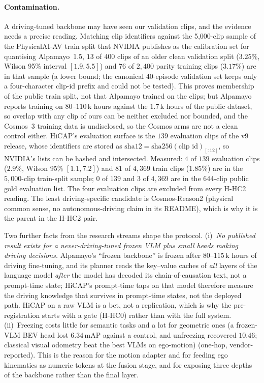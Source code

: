\paragraph{Contamination.}
A driving-tuned backbone may have seen our validation clips, and the evidence needs a precise reading. Matching clip identifiers against the 5,000-clip sample of the PhysicalAI-AV train split that NVIDIA publishes as the calibration set for quantising Alpamayo~1.5, $13$ of $400$ clips of an older clean validation split ($3.25\%$, Wilson 95\% interval $[1.9,5.5]$) and $76$ of $2{,}400$ parity training clips ($3.17\%$) are in that sample\evM{} (a lower bound; the canonical 40-episode validation set keeps only a four-character clip-id prefix and could not be tested). This proves membership of the public train split, not that Alpamayo trained on the clips; but Alpamayo reports training on $80$--$110$\,k hours against the $1.7$\,k hours of the public dataset\evP, so overlap with any clip of ours can be neither excluded nor bounded, and the Cosmos~3 training data is undisclosed, so the Cosmos arms are not a clean control either. HiCAP's evaluation surface is the $139$ evaluation clips of the v9 release, whose identifiers are stored as $\text{sha12}=\text{sha256}(\text{clip id})_{[:12]}$, so NVIDIA's lists can be hashed and intersected. Measured\evM: $4$ of $139$ evaluation clips ($2.9\%$, Wilson 95\% $[1.1,7.2]$) and $81$ of $4{,}369$ train clips ($1.85\%$) are in the $5{,}000$-clip train-split sample; $0$ of $139$ and $3$ of $4{,}369$ are in the 644-clip public gold evaluation list. The four evaluation clips are excluded from every H-HC2 reading. The least driving-specific candidate is Cosmos-Reason2 (physical common sense, no autonomous-driving claim in its README), which is why it is the parent in the H-HC2 pair.

\medskip
Two further facts from the research streams shape the protocol. (i)~\emph{No published result exists for a never-driving-tuned frozen VLM plus small heads making driving decisions.} Alpamayo's ``frozen backbone'' is frozen after $80$--$115$\,k hours of driving fine-tuning, and its planner reads the key--value caches of \emph{all} layers of the language model \emph{after} the model has decoded its chain-of-causation text, not a prompt-time state; HiCAP's prompt-time taps on that model therefore measure the driving knowledge that survives in prompt-time states, not the deployed path. HiCAP on a raw VLM is a bet, not a replication, which is why the pre-registration starts with a gate (H-HC0) rather than with the full system.
(ii)~Freezing costs little for semantic tasks and a lot for geometric ones (a frozen-VLM BEV head lost $6.34$\,mAP against a control, and unfreezing recovered $10.46$; classical visual odometry beat the best VLMs on ego-motion)\evP{} (one-hop, vendor-reported). This is the reason for the motion adapter and for feeding ego kinematics as numeric tokens at the fusion stage, and for exposing three depths of the backbone rather than the final layer.

